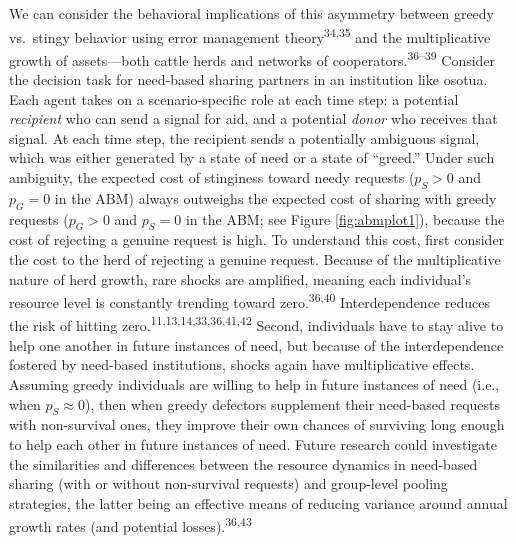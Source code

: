\documentclass[
]{article}
\begin{document}
We can consider the behavioral implications of this asymmetry between greedy vs.~stingy behavior using error management theory\textsuperscript{34,35} and the multiplicative growth of assets---both cattle herds and networks of cooperators.\textsuperscript{36--39} Consider the decision task for need-based sharing partners in an institution like osotua. Each agent takes on a scenario-specific role at each time step: a potential \emph{recipient} who can send a signal for aid, and a potential \emph{donor} who receives that signal. At each time step, the recipient sends a potentially ambiguous signal, which was either generated by a state of need or a state of ``greed.'' Under such ambiguity, the expected cost of stinginess toward needy requests (\(p_S >0\) and \(p_G=0\) in the ABM) always outweighs the expected cost of sharing with greedy requests (\(p_G>0\) and \(p_S=0\) in the ABM; see Figure \ref{fig:abmplot1}), because the cost of rejecting a genuine request is high. To understand this cost, first consider the cost to the herd of rejecting a genuine request. Because of the multiplicative nature of herd growth, rare shocks are amplified, meaning each individual's resource level is constantly trending toward zero.\textsuperscript{36,40} Interdependence reduces the risk of hitting zero.\textsuperscript{11,13,14,33,36,41,42} Second, individuals have to stay alive to help one another in future instances of need, but because of the interdependence fostered by need-based institutions, shocks again have multiplicative effects. Assuming greedy individuals are willing to help in future instances of need (i.e., when \(p_S \approx 0\)), then when greedy defectors supplement their need-based requests with non-survival ones, they improve their own chances of surviving long enough to help each other in future instances of need. Future research could investigate the similarities and differences between the resource dynamics in need-based sharing (with or without non-survival requests) and group-level pooling strategies, the latter being an effective means of reducing variance around annual growth rates (and potential losses).\textsuperscript{36,43}
\end{document}
